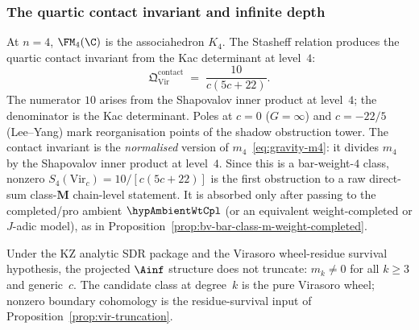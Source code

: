 \subsubsection*{The quartic contact invariant and infinite depth}

At $n = 4$, $\FM_4(\C)$ is the associahedron $K_4$. The Stasheff
relation produces the quartic contact invariant from the Kac
determinant at level~$4$:
\begin{equation}\label{eq:gravity-quartic}
\mathfrak{Q}^{\mathrm{contact}}_{\mathrm{Vir}}
\;=\;
\frac{10}{c(5c+22)}.
\end{equation}
The numerator $10$ arises from the Shapovalov inner product at level~$4$;
the denominator is the Kac determinant. Poles at $c = 0$ ($G = \infty$) and $c = -22/5$
(Lee--Yang) mark reorganisation points of the shadow obstruction tower.
The contact invariant is the \emph{normalised} version of
$m_4$~\eqref{eq:gravity-m4}: it divides $m_4$ by the Shapovalov inner
product at level~$4$.
Since this is a bar-weight-$4$ class, nonzero
$S_4(\mathrm{Vir}_c)=10/[c(5c+22)]$ is the first obstruction to a raw
direct-sum class-$\mathbf M$ chain-level statement. It is absorbed only
after passing to the completed/pro ambient $\hypAmbientWtCpl$ (or an
equivalent weight-completed or $J$-adic model), as in
Proposition~\ref{prop:bv-bar-class-m-weight-completed}.

Under the KZ analytic SDR package and the Virasoro wheel-residue
survival hypothesis, the projected $\Ainf$ structure does not truncate:
$m_k \ne 0$ for all $k \ge 3$ and generic~$c$. The candidate class at
degree~$k$ is the pure Virasoro wheel; nonzero boundary cohomology is
the residue-survival input of Proposition~\ref{prop:vir-truncation}.

